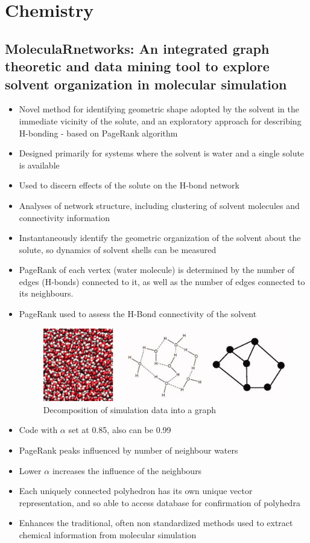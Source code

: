 \documentclass[11pt]{report}
\begin{document}
\section{Chemistry}
\subsection{MoleculaRnetworks: An integrated graph theoretic and data mining tool to explore solvent organization in molecular simulation}
\begin{itemize}
\item Novel method for identifying geometric shape adopted by the solvent in the immediate vicinity of the solute, and an exploratory approach for describing H-bonding - based on PageRank algorithm
\item Designed primarily for systems where the solvent is water and a single solute is available
\item Used to discern effects of the solute on the H-bond network
\item Analyses of network structure, including clustering of solvent molecules and connectivity information
\item Instantaneously identify the geometric organization of the solvent about the solute, so dynamics of solvent shells can be measured
\item PageRank of each vertex (water molecule) is determined by the number of edges (H-bonds) connected to it, as well as the number of edges connected to its neighbours.
\item PageRank used to assess the H-Bond connectivity of the solvent
\begin{figure}
\includegraphics[width=\linewidth]{Decomposition_of_simulation_date_into_a_graph_-chem.jpg}
\caption{Decomposition of simulation data into a graph}
\label{fig:chem}
\end{figure}
\item Code with $\alpha$ set at 0.85, also can be 0.99
\item PageRank peaks influenced by number of neighbour waters
\item Lower $\alpha$ increases the influence of the neighbours
\item Each uniquely connected polyhedron has its own unique vector representation, and so able to access database for confirmation of polyhedra
\item Enhances the traditional, often non standardized methods used to extract chemical information from molecular simulation
\end{itemize}
\end{document}
